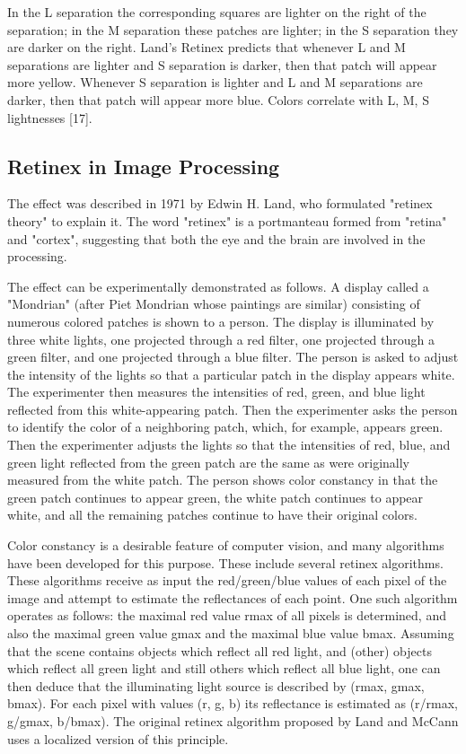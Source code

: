
In the L separation the corresponding squares are lighter on the right of the separation; in the M separation these patches are lighter; in the S separation they are darker on the right. Land’s Retinex predicts that whenever L and M separations are lighter and S separation is darker, then that patch will appear more yellow. Whenever S separation is lighter and L and M separations are darker, then that patch will appear more blue. Colors correlate with L, M, S lightnesses [17].

\subsection{Retinex in Image Processing}
The effect was described in 1971 by Edwin H. Land, who formulated "retinex theory" to explain it. The word "retinex" is a portmanteau formed from "retina" and "cortex", suggesting that both the eye and the brain are involved in the processing.

The effect can be experimentally demonstrated as follows. A display called a "Mondrian" (after Piet Mondrian whose paintings are similar) consisting of numerous colored patches is shown to a person. The display is illuminated by three white lights, one projected through a red filter, one projected through a green filter, and one projected through a blue filter. The person is asked to adjust the intensity of the lights so that a particular patch in the display appears white. The experimenter then measures the intensities of red, green, and blue light reflected from this white-appearing patch. Then the experimenter asks the person to identify the color of a neighboring patch, which, for example, appears green. Then the experimenter adjusts the lights so that the intensities of red, blue, and green light reflected from the green patch are the same as were originally measured from the white patch. The person shows color constancy in that the green patch continues to appear green, the white patch continues to appear white, and all the remaining patches continue to have their original colors.

Color constancy is a desirable feature of computer vision, and many algorithms have been developed for this purpose. These include several retinex algorithms. These algorithms receive as input the red/green/blue values of each pixel of the image and attempt to estimate the reflectances of each point. One such algorithm operates as follows: the maximal red value rmax of all pixels is determined, and also the maximal green value gmax and the maximal blue value bmax. Assuming that the scene contains objects which reflect all red light, and (other) objects which reflect all green light and still others which reflect all blue light, one can then deduce that the illuminating light source is described by (rmax, gmax, bmax). For each pixel with values (r, g, b) its reflectance is estimated as (r/rmax, g/gmax, b/bmax). The original retinex algorithm proposed by Land and McCann uses a localized version of this principle.

